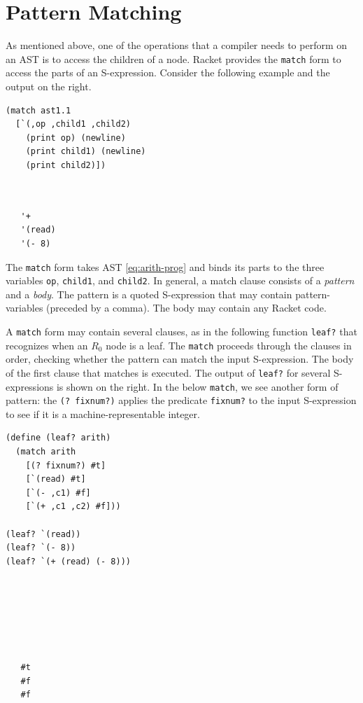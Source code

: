 \documentclass[11pt]{book}
\begin{document}
\section{Pattern Matching}
\label{sec:pattern-matching}

As mentioned above, one of the operations that a compiler needs to
perform on an AST is to access the children of a node.  Racket
provides the \texttt{match} form to access the parts of an
S-expression. Consider the following example and the output on the
right.
\begin{center}
\begin{minipage}{0.5\textwidth}
\begin{lstlisting}
(match ast1.1
  [`(,op ,child1 ,child2)
    (print op) (newline)
    (print child1) (newline)
    (print child2)])
\end{lstlisting}
\end{minipage}
\vrule
\begin{minipage}{0.25\textwidth}
\begin{lstlisting}


   '+
   '(read)
   '(- 8)
\end{lstlisting}
\end{minipage}
\end{center}
The \texttt{match} form takes AST \eqref{eq:arith-prog} and binds its
parts to the three variables \texttt{op}, \texttt{child1}, and
\texttt{child2}. In general, a match clause consists of a
\emph{pattern} and a \emph{body}. The pattern is a quoted S-expression
that may contain pattern-variables (preceded by a comma).  The body
may contain any Racket code.

A \texttt{match} form may contain several clauses, as in the following
function \texttt{leaf?} that recognizes when an $R_0$ node is
a leaf. The \texttt{match} proceeds through the clauses in order,
checking whether the pattern can match the input S-expression. The
body of the first clause that matches is executed. The output of
\texttt{leaf?} for several S-expressions is shown on the right. In the
below \texttt{match}, we see another form of pattern: the \texttt{(?
  fixnum?)} applies the predicate \texttt{fixnum?} to the input
S-expression to see if it is a machine-representable integer.
\begin{center}
\begin{minipage}{0.5\textwidth}
\begin{lstlisting}
(define (leaf? arith)
  (match arith
    [(? fixnum?) #t]
    [`(read) #t]
    [`(- ,c1) #f]
    [`(+ ,c1 ,c2) #f]))

(leaf? `(read))
(leaf? `(- 8))
(leaf? `(+ (read) (- 8)))
\end{lstlisting}
\end{minipage}
\vrule
\begin{minipage}{0.25\textwidth}
\begin{lstlisting}






   #t
   #f
   #f
\end{lstlisting}
\end{minipage}
\end{center}
\end{document}
